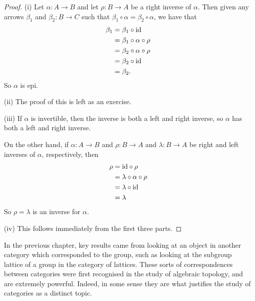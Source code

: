 \begin{proof}
  (i) Let $\alpha: A \to B$ and let $\rho: B \to A$ be a right inverse
  of $\alpha$.  Then given any arrows $\beta_{1}$ and $\beta_{2}: B
  \to C$ such that $\beta_{1} \circ \alpha = \beta_{2} \circ \alpha$,
  we have that
  \begin{align*}
     \beta_{1} &= \beta_{1} \circ \text{id} \\
     &= \beta_{1} \circ \alpha \circ \rho\\
     &= \beta_{2} \circ \alpha \circ \rho \\
     &= \beta_{2} \circ \text{id}\\
     &= \beta_{2}.
  \end{align*}
  So $\alpha$ is epi.
  
  (ii) The proof of this is left as an exercise.
  
  (iii) If $\alpha$ is invertible, then the inverse is both a left 
  and right inverse, so $\alpha$ has both a left and right inverse.
  
  On the other hand, if $\alpha: A \to B$ and $\rho: B \to A$ and
  $\lambda: B \to A$ be right and left inverses of $\alpha$,
  respectively, then
  \begin{align*}
    \rho &= \text{id} \circ \rho \\
         &= \lambda \circ \alpha \circ \rho \\
&= \lambda \circ \text{id} \\
&= \lambda
  \end{align*}
  So $\rho = \lambda$ is an inverse for $\alpha$.
  
  (iv) This follows immediately from the first three parts.
  
\end{proof}

In the previous chapter, key results came from looking at an object in
another category which corresponded to the group, such as looking at
the subgroup lattice of a group in the category of lattices.  These
sorts of correspondences between categories were first recognised in
the study of algebraic topology, and are extremely powerful.  Indeed,
in some sense they are what justifies the study of categories as a
distinct topic.

